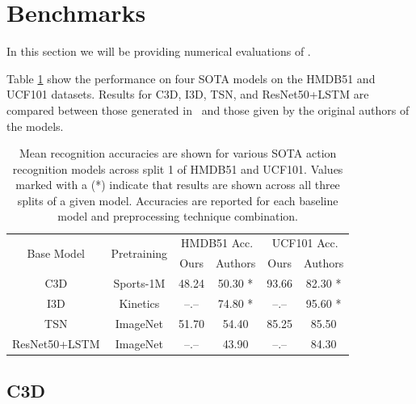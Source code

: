 \documentclass{llncs}
\begin{document}
\section{Benchmarks}
\label{sec:benchmarks}
In this section we will be providing numerical evaluations of \acro.

Table \ref{tab:model_results} show the performance on four SOTA models on the HMDB51 and UCF101 datasets.
Results for C3D, I3D, TSN, and ResNet50+LSTM are compared between those generated in \acro~and those given by the original authors of the models.

\begin{table}[h!]
\begin{center}
\caption{Mean recognition accuracies are shown for various SOTA action recognition models across split 1 of HMDB51 and UCF101.
Values marked with a (*) indicate that results are shown across all three splits of a given model.
Accuracies are reported for each baseline model and preprocessing technique combination.}
\label{tab:model_results}
\begin{tabular}{c|c|c|c||c|c}
\hline
\multirow{2}{*}{Base Model} & \multirow{2}{*}{Pretraining} & \multicolumn{2}{c||}{HMDB51 Acc.} & \multicolumn{2}{c}{UCF101 Acc.} \\\cline{3-6}
& & Ours & Authors & Ours & Authors \\
\hline
C3D & Sports-1M & 48.24 & 50.30 * & 93.66 & 82.30 * \\
\hline
I3D & Kinetics & --.-- & 74.80 * & --.-- & 95.60 * \\
\hline
TSN & ImageNet & 51.70 & 54.40 & 85.25 & 85.50 \\
\hline
ResNet50+LSTM & ImageNet & --.-- & 43.90 & --.-- & 84.30 \\
\hline
\end{tabular}
\end{center}
\end{table}


\subsection{C3D}
\label{sec:c3d}
\end{document}

